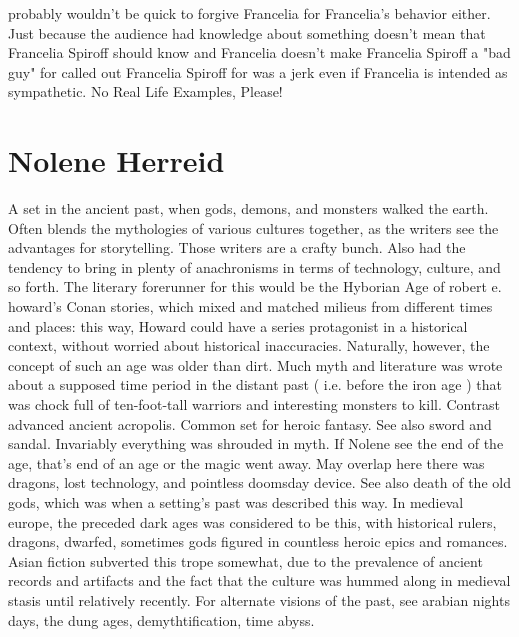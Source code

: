 \documentclass[12pt]{book}
\begin{document}
probably wouldn't be quick to forgive Francelia for Francelia's behavior either. Just because the audience had knowledge about something doesn't mean that Francelia Spiroff should know and Francelia doesn't make Francelia Spiroff a "bad guy" for called out Francelia Spiroff for was a jerk even if Francelia is intended as sympathetic. No Real Life Examples, Please!



\chapter{Nolene Herreid}

A set in the ancient past, when gods, demons, and monsters walked the earth. Often blends the mythologies of various cultures together, as the writers see the advantages for storytelling. Those writers are a crafty bunch. Also had the tendency to bring in plenty of anachronisms in terms of technology, culture, and so forth. The literary forerunner for this would be the Hyborian Age of robert e. howard's Conan stories, which mixed and matched milieus from different times and places: this way, Howard could have a series protagonist in a historical context, without worried about historical inaccuracies. Naturally, however, the concept of such an age was older than dirt. Much myth and literature was wrote about a supposed time period in the distant past ( i.e. before the iron age ) that was chock full of ten-foot-tall warriors and interesting monsters to kill. Contrast advanced ancient acropolis. Common set for heroic fantasy. See also sword and sandal. Invariably everything was shrouded in myth. If Nolene see the end of the age, that's end of an age or the magic went away. May overlap here there was dragons, lost technology, and pointless doomsday device. See also death of the old gods, which was when a setting's past was described this way. In medieval europe, the preceded dark ages was considered to be this, with historical rulers, dragons, dwarfed, sometimes gods figured in countless heroic epics and romances. Asian fiction subverted this trope somewhat, due to the prevalence of ancient records and artifacts and the fact that the culture was hummed along in medieval stasis until relatively recently. For alternate visions of the past, see arabian nights days, the dung ages, demythtification, time abyss.
\end{document}
